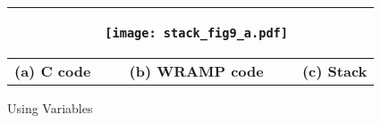 \begin{figure}[!hbtp]
\begin{center}
\begin{tabular}{|c|c|c|}
\begin{minipage}[t]{6cm}
\begin{scriptsize}
\begin{verbatim}
\end{verbatim}
\end{scriptsize}
\end{minipage}
&
\begin{minipage}[t]{5cm}
\begin{center}

\vspace{3.5cm}
\texttt{[image: stack\_fig9\_a.pdf]}

\end{center}
\end{minipage}
\\
\hline
\textbf{(a) C code} & \textbf{(b) WRAMP code} & \textbf{(c) Stack}\\
\hline
\end{tabular}
\end{center}

\caption{Using Variables}
\label{var_example}
\end{figure}


